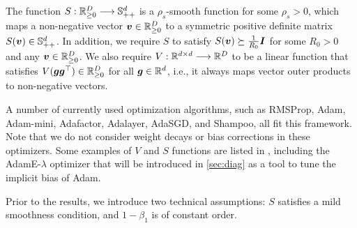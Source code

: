 The function $S: \mathbb{R}_{\ge 0}^{D} \longrightarrow \mathbb{S}^d_{++}
$ is a $\rho_s$-smooth function for some $\rho_s > 0$, which maps a non-negative vector ${\bm{v}} \in \mathbb{R}_{\ge 0}^{D}$ to a symmetric positive definite matrix $S({\bm{v}}) \in \mathbb{S}^d_{++}$.
In addition, we require $S$ to satisfy $S({\bm{v}}) \succeq \frac{1}{R_0} {\bm{I}}$  for some $R_0 > 0$ and any ${\bm{v}} \in \mathbb{R}_{\ge 0}^{D}$. We also require $V: \mathbb{R}^{d\times d} \longrightarrow \mathbb{R}^{D}$ to be a linear function that satisfies $V({\bm{g}}{\bm{g}}^\top) \in \mathbb{R}_{\ge 0}^{D}$ for all ${\bm{g}} \in \mathbb{R}^d$, i.e., it always maps vector outer products to non-negative vectors.



A number of currently used optimization algorithms, such as RMSProp, Adam, Adam-mini, Adafactor\footnotemark[1], Adalayer, AdaSGD, and  Shampoo\footnotemark[2], all fit this framework. Note that we do not consider weight decays or bias corrections in these optimizers. Some examples of $V$ and $S$ functions are listed in , including the AdamE-$\lambda$ optimizer that will be introduced in \cref{sec:diag} as a tool to tune the implicit bias of Adam.





Prior to the results, we introduce two technical assumptions: $S$ satisfies a mild smoothness condition, and $1-\beta_1$ is of constant order.




